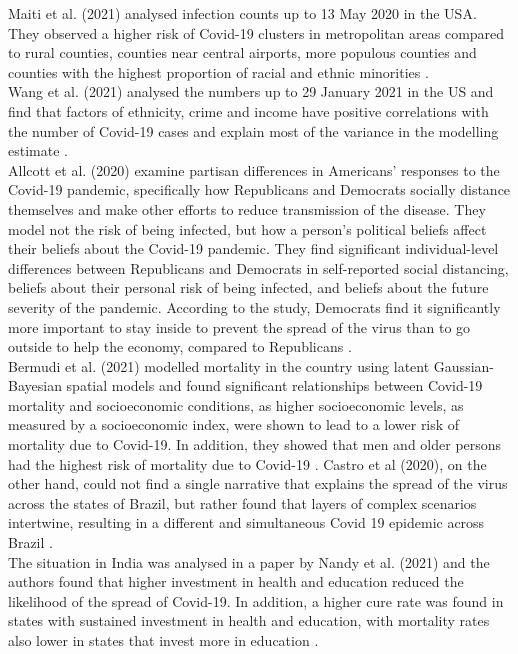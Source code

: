 Maiti et al. (2021) analysed infection counts up to 13 May 2020 in the USA. They observed a higher risk of Covid-19 clusters in metropolitan areas compared to rural counties, counties near central airports, more populous counties and counties with the highest proportion of racial and ethnic minorities \autocite[][]{maiti2021exploring}. \\
Wang et al. (2021) analysed the numbers up to 29 January 2021 in the US and find that factors of ethnicity, crime and income have positive correlations with the number of Covid-19 cases and explain most of the variance in the modelling estimate \autocite[][]{wang2021spatiotemporal}. \\
Allcott et al. (2020) examine partisan differences in Americans' responses to the Covid-19 pandemic, specifically how Republicans and Democrats socially distance themselves and make other efforts to reduce transmission of the disease. They model not the risk of being infected, but how a person's political beliefs affect their beliefs about the Covid-19 pandemic. They find significant individual-level differences between Republicans and Democrats in self-reported social distancing, beliefs about their personal risk of being infected, and beliefs about the future severity of the pandemic. According to the study, Democrats find it significantly more important to stay inside to prevent the spread of the virus than to go outside to help the economy, compared to Republicans \autocite[][]{allcott2020polarization}. \\
Bermudi et al. (2021) modelled mortality in the country using latent Gaussian-Bayesian spatial models and found significant relationships between Covid-19 mortality and socioeconomic conditions, as higher socioeconomic levels, as measured by a socioeconomic index, were shown to lead to a lower risk of mortality due to Covid-19. In addition, they showed that men and older persons had the highest risk of mortality due to Covid-19 \autocite[][]{bermudi2021spatiotemporal}. Castro et al (2020), on the other hand, could not find a single narrative that explains the spread of the virus across the states of Brazil, but rather found that layers of complex scenarios intertwine, resulting in a different and simultaneous Covid 19 epidemic across Brazil \autocite[][]{castro2021spatiotemporal}. \\
The situation in India was analysed in a paper by Nandy et al. (2021) and the authors found that higher investment in health and education reduced the likelihood of the spread of Covid-19. In addition, a higher cure rate was found in states with sustained investment in health and education, with mortality rates also lower in states that invest more in education \autocite[][]{nandy2021managing}. \\
